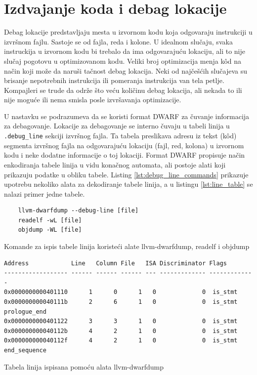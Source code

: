 \documentclass[12pt,oneside]{memoir}
\begin{document}
\section{Izdvajanje koda i debag lokacije}

\label{sec:izdvajanje_koda_debag}

Debag lokacije predstavljaju mesta u izvornom kodu koja odgovaraju instrukciji u izvršnom fajlu. Sastoje se od fajla, reda i kolone.
U idealnom slučaju, svaka instruckija u izvornom kodu bi trebalo da ima odgovarajuću lokaciju, ali to nije slučaj pogotovu u optimizovanom kodu.
Veliki broj optimizacija menja k\^od na način koji može da naruši tačnost debag lokacija.
Neki od najčešćih slučajeva su brisanje nepotrebnih instrukcija ili pomeranja instrukcija van tela petlje.
Kompajleri se trude da održe što veću količinu debag lokacija, ali nekada to ili nije moguće ili nema smisla posle izvršavanja optimizacije.

U nastavku se podrazumeva da se koristi format DWARF za čuvanje informacija za debagovanje.
Lokacije za debagovanje se interno čuvaju u tabeli linija u \verb|.debug_line| sekciji izvršnog fajla.
Ta tabela preslikava adresu iz tekst (k\^od) segmenta izvršnog fajla na odgovarajuću lokaciju (fajl, red, kolona) u izvornom kodu i neke dodatne informacije o toj lokaciji.
Format DWARF propisuje način enkodiranja tabele linija u vidu konačnog automata, ali postoje alati koji prikazuju podatke u obliku tabele.
Listing \ref{lst:debug_line_commands} prikazuje upotrebu nekoliko alata za dekodiranje tabele linija, a u listingu \ref{lst:line_table} se nalazi primer jedne tabele.

\begin{listing}[!ht]
  \begin{verbatim}
    llvm-dwarfdump --debug-line [file]
    readelf -wL [file]
    objdump -WL [file]
  \end{verbatim}
  \caption{Komande za ispis tabele linija koristeći alate llvm-dwarfdump, readelf i objdump}
  \label{lst:debug_line_commands}
\end{listing}

\begin{listing}[!ht]
  \begin{verbatim}
Address            Line   Column File   ISA Discriminator Flags
------------------ ------ ------ ------ --- ------------- -------------
0x0000000000401110      1      0      1   0             0  is_stmt
0x000000000040111b      2      6      1   0             0  is_stmt prologue_end
0x0000000000401122      3      3      1   0             0  is_stmt
0x000000000040112b      4      2      1   0             0  is_stmt
0x000000000040112f      4      2      1   0             0  is_stmt end_sequence
  \end{verbatim}
  \caption{Tabela linija ispisana pomoću alata llvm-dwarfdump}
  \label{lst:line_table}
\end{listing}
\end{document}
